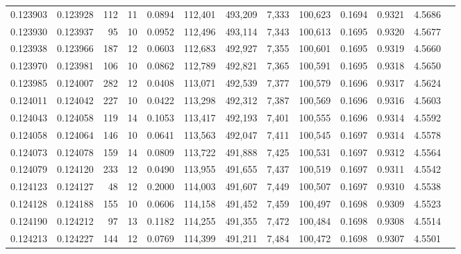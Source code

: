 \begin{tabular}{rrrrrrrrrrrrr}
0.123903 & 0.123928 &   112 &  11 &                                     0.0894 & 112,401 & 493,209 &   7,333 & 100,623 & 0.1694 & 0.9321 & 4.5686 \\
0.123930 & 0.123937 &    95 &  10 &                                     0.0952 & 112,496 & 493,114 &   7,343 & 100,613 & 0.1695 & 0.9320 & 4.5677 \\
0.123938 & 0.123966 &   187 &  12 &                                     0.0603 & 112,683 & 492,927 &   7,355 & 100,601 & 0.1695 & 0.9319 & 4.5660 \\
0.123970 & 0.123981 &   106 &  10 &                                     0.0862 & 112,789 & 492,821 &   7,365 & 100,591 & 0.1695 & 0.9318 & 4.5650 \\
0.123985 & 0.124007 &   282 &  12 &                                     0.0408 & 113,071 & 492,539 &   7,377 & 100,579 & 0.1696 & 0.9317 & 4.5624 \\
0.124011 & 0.124042 &   227 &  10 &                                     0.0422 & 113,298 & 492,312 &   7,387 & 100,569 & 0.1696 & 0.9316 & 4.5603 \\
0.124043 & 0.124058 &   119 &  14 &                                     0.1053 & 113,417 & 492,193 &   7,401 & 100,555 & 0.1696 & 0.9314 & 4.5592 \\
0.124058 & 0.124064 &   146 &  10 &                                     0.0641 & 113,563 & 492,047 &   7,411 & 100,545 & 0.1697 & 0.9314 & 4.5578 \\
0.124073 & 0.124078 &   159 &  14 &                                     0.0809 & 113,722 & 491,888 &   7,425 & 100,531 & 0.1697 & 0.9312 & 4.5564 \\
0.124079 & 0.124120 &   233 &  12 &                                     0.0490 & 113,955 & 491,655 &   7,437 & 100,519 & 0.1697 & 0.9311 & 4.5542 \\
0.124123 & 0.124127 &    48 &  12 &                                     0.2000 & 114,003 & 491,607 &   7,449 & 100,507 & 0.1697 & 0.9310 & 4.5538 \\
0.124128 & 0.124188 &   155 &  10 &                                     0.0606 & 114,158 & 491,452 &   7,459 & 100,497 & 0.1698 & 0.9309 & 4.5523 \\
0.124190 & 0.124212 &    97 &  13 &                                     0.1182 & 114,255 & 491,355 &   7,472 & 100,484 & 0.1698 & 0.9308 & 4.5514 \\
0.124213 & 0.124227 &   144 &  12 &                                     0.0769 & 114,399 & 491,211 &   7,484 & 100,472 & 0.1698 & 0.9307 & 4.5501 \\

\end{tabular}
